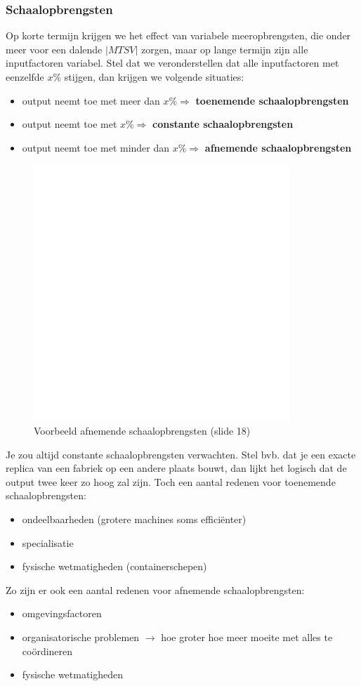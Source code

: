 \subsubsection{Schaalopbrengsten}
Op korte termijn krijgen we het effect van variabele meeropbrengsten, die onder meer voor een dalende $|MTSV|$ zorgen, maar op lange termijn zijn alle inputfactoren variabel. Stel dat we veronderstellen dat alle inputfactoren met eenzelfde $x\%$ stijgen, dan krijgen we volgende situaties:
\begin{itemize}
	\item output neemt toe met meer dan $x$\%$\Rightarrow$ \textbf{toenemende schaalopbrengsten}
	\item output neemt toe met $x$\%$\Rightarrow$ \textbf{constante schaalopbrengsten}
	\item output neemt toe met minder dan $x$\%$\Rightarrow$ \textbf{afnemende schaalopbrengsten}
\end{itemize}

\begin{figure}[htbp]
	\centering
	\includegraphics[scale=0.4]{Images/white.png}
	\caption{Voorbeeld afnemende schaalopbrengsten (slide 18)}
	\label{fig:voorbeeldAfnemendeSchaalopbrengsten}
\end{figure}

Je zou altijd constante schaalopbrengsten verwachten. Stel bvb. dat je een exacte replica van een fabriek op een andere plaats bouwt, dan lijkt het logisch dat de output twee keer zo hoog zal zijn. Toch een aantal redenen voor toenemende schaalopbrengsten:
\begin{itemize}
	\item ondeelbaarheden (grotere machines soms effici\"enter)
	\item specialisatie
	\item fysische wetmatigheden (containerschepen)
\end{itemize}
Zo zijn er ook een aantal redenen voor afnemende schaalopbrengsten:
\begin{itemize}
	\item omgevingsfactoren
	\item organisatorische problemen $\rightarrow$ hoe groter hoe meer moeite met alles te co\"ordineren
	\item fysische wetmatigheden
\end{itemize}

